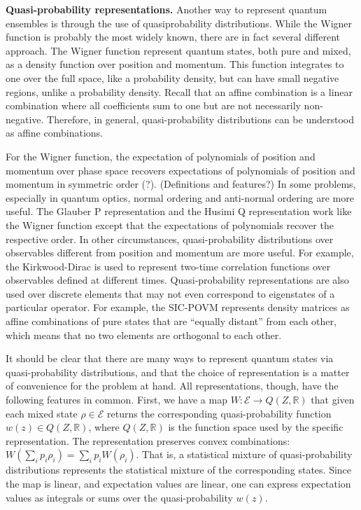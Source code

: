 \documentclass[10pt,twocolumn, nofootinbib]{revtex4-2}
\newcommand{\Ens}[1][E] {\mathcal{#1}} %
\begin{document}


\textbf{Quasi-probability representations.} Another way to represent quantum ensembles is through the use of quasiprobability distributions. While the Wigner function is probably the most widely known, there are in fact several different approach. The Wigner function represent quantum states, both pure and mixed, as a density function over position and momentum. This function integrates to one over the full space, like a probability density, but can have small negative regions, unlike a probability density. Recall that an affine combination is a linear combination where all coefficients sum to one but are not necessarily non-negative. Therefore, in general, quasi-probability distributions can be understood as affine combinations.

For the Wigner function, the expectation of polynomials of position and momentum over phase space recovers expectations of polynomials of position and momentum in symmetric order (?). (Definitions and features?) In some problems, especially in quantum optics, normal ordering and anti-normal ordering are more useful. The Glauber P representation and the Husimi Q representation work like the Wigner function except that the expectations of polynomials recover the respective order. In other circumstances, quasi-probability distributions over observables different from position and momentum are more useful. For example, the Kirkwood-Dirac is used to represent two-time correlation functions over observables defined at different times. Quasi-probability representations are also used over discrete elements that may not even correspond to eigenstates of a particular operator. For example, the SIC-POVM represents density matrices as affine combinations of pure states that are ``equally distant'' from each other, which means that no two elements are orthogonal to each other.

It should be clear that there are many ways to represent quantum states via quasi-probability distributions, and that the choice of representation is a matter of convenience for the problem at hand. All representations, though, have the following features in common. First, we have a map $W : \Ens \to Q(Z,\mathbb{R})$ that given each mixed state $\rho \in \Ens$ returns the corresponding quasi-probability function $w(z) \in Q(Z,\mathbb{R})$, where $Q(Z,\mathbb{R})$ is the function space used by the specific representation. The representation preserves convex combinations: $W(\sum_i p_i \rho_i) = \sum_i p_i W(\rho_i)$. That is, a statistical mixture of quasi-probability distributions represents the statistical mixture of the corresponding states. Since the map is linear, and expectation values are linear, one can express expectation values as integrals or sums over the quasi-probability $w(z)$. 
\end{document}
